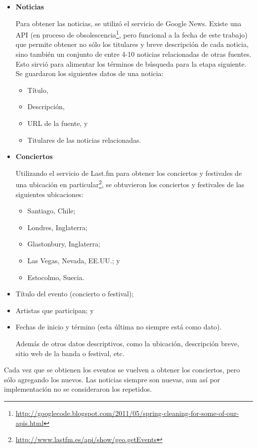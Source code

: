 \documentclass[upright, contnum]{umemoria}
\begin{document}
\begin{itemize}
\item \textbf{Noticias}

  Para obtener las noticias, se utilizó el servicio de Google
  News. Existe una API (en proceso de
  obsolescencia\footnote{\href{http://googlecode.blogspot.com/2011/05/spring-cleaning-for-some-of-our-apis.html}{http://googlecode.blogspot.com/2011/05/spring-cleaning-for-some-of-our-apis.html} }, 
  pero funcional a la fecha de este trabajo) que permite
  obtener no sólo los titulares y breve descripción de cada noticia,
  sino también un conjunto de entre 4-10 noticias relacionadas de otras
  fuentes. Esto sirvió para alimentar los términos de búsqueda para la
  etapa siguiente. Se guardaron los siguientes datos de una noticia:

\begin{itemize}
\item Título,
\item Descripción,
\item URL de la fuente, y
\item Titulares de las noticias relacionadas.
\end{itemize}

\item \textbf{Conciertos}

  Utilizando el servicio de Last.fm para obtener los conciertos y
  festivales de una ubicación en
  particular\footnote{\href{http://www.lastfm.es/api/show/geo.getEvents}{http://www.lastfm.es/api/show/geo.getEvents} }, se
  obtuvieron los conciertos y festivales de las siguientes
  ubicaciones:

\begin{itemize}
\item Santiago, Chile;
\item Londres, Inglaterra;
\item Glastonbury, Inglaterra;
\item Las Vegas, Nevada, EE.UU.; y
\item Estocolmo, Suecia.
\end{itemize}

\item Título del evento (concierto o festival);
\item Artistas que participan; y
\item Fechas de inicio y término (esta última no siempre está como
    dato).


  Además de otros datos descriptivos, como la ubicación, descripción
  breve, sitio web de la banda o festival, etc.
\end{itemize}
Cada vez que se obtienen los eventos se vuelven a obtener los
conciertos, pero sólo agregando los nuevos. Las noticias siempre son
nuevas, aun así por implementación no se consideraron los repetidos.
  
\end{document}
